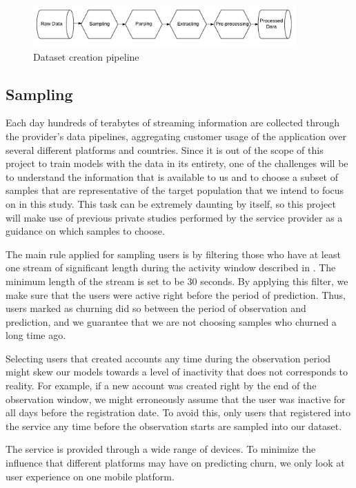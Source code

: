\documentclass{kththesis}
\begin{document}
	\begin{figure}[h]
    \centering
    \includegraphics[width=0.9\textwidth,keepaspectratio]{figures/pipeline.pdf}
    \caption{Dataset creation pipeline}
    \label{fig:pipeline}
	\end{figure}

\subsection{Sampling}
\label{sec:sampling}

Each day hundreds of terabytes of streaming information are collected through the provider's data pipelines, aggregating customer usage of the application over several different platforms and countries. Since it is out of the scope of this project to train models with the data in its entirety, one of the challenges will be to understand the information that is available to us and to choose a subset of samples that are representative of the target population that we intend to focus on in this study. This task can be extremely daunting by itself, so this project will make use of previous private studies performed by the service provider as a guidance on which samples to choose.

The main rule applied for sampling users is by filtering those who have at least one stream of significant length during the activity window described in . The minimum length of the stream is set to be 30 seconds. By applying this filter, we make sure that the users were active right before the period of prediction. Thus, users marked as churning did so between the period of observation and prediction, and we guarantee that we are not choosing samples who churned a long time ago.

Selecting users that created accounts any time during the observation period might skew our models towards a level of inactivity that does not corresponds to reality. For example, if a new account was created right by the end of the observation window, we might erroneously assume that the user was inactive for all days before the registration date. To avoid this, only users that registered into the service any time before the observation starts are sampled into our dataset. 

The service is provided through a wide range of devices. To minimize the influence that different platforms may have on predicting churn, we only look at user experience on one mobile platform. 
\end{document}
